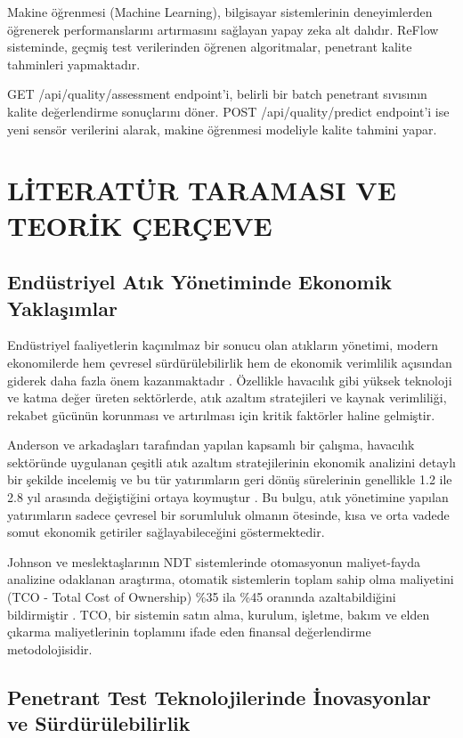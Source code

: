 \documentclass[12pt,a4paper]{article}
\begin{document}
Makine öğrenmesi (Machine Learning), bilgisayar sistemlerinin deneyimlerden öğrenerek performanslarını artırmasını sağlayan yapay zeka alt dalıdır. ReFlow sisteminde, geçmiş test verilerinden öğrenen algoritmalar, penetrant kalite tahminleri yapmaktadır.

GET /api/quality/assessment endpoint'i, belirli bir batch penetrant sıvısının kalite değerlendirme sonuçlarını döner. POST /api/quality/predict endpoint'i ise yeni sensör verilerini alarak, makine öğrenmesi modeliyle kalite tahmini yapar.

\section{LİTERATÜR TARAMASI VE TEORİK ÇERÇEVE}

\subsection{Endüstriyel Atık Yönetiminde Ekonomik Yaklaşımlar}

Endüstriyel faaliyetlerin kaçınılmaz bir sonucu olan atıkların yönetimi, modern ekonomilerde hem çevresel sürdürülebilirlik hem de ekonomik verimlilik açısından giderek daha fazla önem kazanmaktadır \cite{porter1995competitive}. Özellikle havacılık gibi yüksek teknoloji ve katma değer üreten sektörlerde, atık azaltım stratejileri ve kaynak verimliliği, rekabet gücünün korunması ve artırılması için kritik faktörler haline gelmiştir.

Anderson ve arkadaşları tarafından yapılan kapsamlı bir çalışma, havacılık sektöründe uygulanan çeşitli atık azaltım stratejilerinin ekonomik analizini detaylı bir şekilde incelemiş ve bu tür yatırımların geri dönüş sürelerinin genellikle 1.2 ile 2.8 yıl arasında değiştiğini ortaya koymuştur \cite{anderson2019economic}. Bu bulgu, atık yönetimine yapılan yatırımların sadece çevresel bir sorumluluk olmanın ötesinde, kısa ve orta vadede somut ekonomik getiriler sağlayabileceğini göstermektedir.

Johnson ve meslektaşlarının NDT sistemlerinde otomasyonun maliyet-fayda analizine odaklanan araştırma, otomatik sistemlerin toplam sahip olma maliyetini (TCO - Total Cost of Ownership) \%35 ila \%45 oranında azaltabildiğini bildirmiştir \cite{johnson2018cost}. TCO, bir sistemin satın alma, kurulum, işletme, bakım ve elden çıkarma maliyetlerinin toplamını ifade eden finansal değerlendirme metodolojisidir.

\subsection{Penetrant Test Teknolojilerinde İnovasyonlar ve Sürdürülebilirlik}
\end{document}
